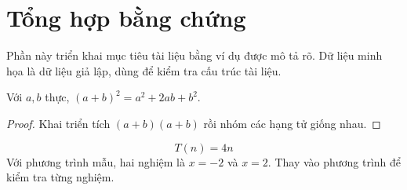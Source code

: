 \section{Tổng hợp bằng chứng}


\label{sec:chapter2}
Phần này triển khai mục tiêu tài liệu bằng ví dụ được mô tả rõ. Dữ liệu minh họa là dữ liệu giả lập, dùng để kiểm tra cấu trúc tài liệu.

\begin{demotheorem}
Với $a,b$ thực, $(a+b)^2=a^2+2ab+b^2$.
\end{demotheorem}
\begin{proof}
Khai triển tích $(a+b)(a+b)$ rồi nhóm các hạng tử giống nhau.
\end{proof}
\[T(n)=4n\]
Với phương trình mẫu, hai nghiệm là $x=-2$ và $x=2$. Thay vào phương trình để kiểm tra từng nghiệm.
